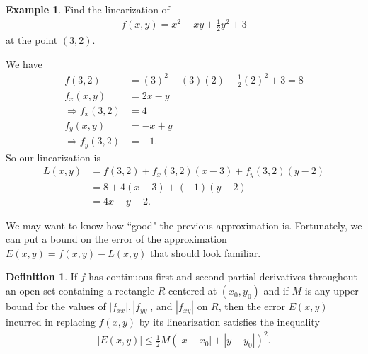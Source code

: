 \documentclass[12pt, letter]{article}
\theoremstyle{plain}
\numberwithin{theorem}{section}
\theoremstyle{definition}
\newtheorem{definition}[theorem]{Definition}
\newtheorem{example}[theorem]{Example}
\begin{document}
\bigskip

\hrulefill

\bigskip


\begin{example}
Find the linearization of
\begin{align*}
f(x,y) = x^2-xy+\frac{1}{2}y^2+3
\end{align*}
at the point $(3,2)$.

\smallskip

We have
\begin{align*}
f(3,2) &= (3)^2-(3)(2)+\frac{1}{2}(2)^2+3 = 8\\
f_x(x,y) &=2x-y\\
\Rightarrow f_x(3,2) &= 4\\
f_y(x,y) &= -x+y\\
\Rightarrow f_y(3,2) &= -1.
\end{align*}
So our linearization is
\begin{align*}
L(x,y) &= f(3,2) + f_x(3,2)(x-3)+f_y(3,2)(y-2)\\
&= 8+4(x-3)+(-1)(y-2)\\
&=4x-y-2.
\end{align*}
\end{example}

\bigskip

\hrulefill

\bigskip

We may want to know how ``good" the previous approximation is. Fortunately, we can put a bound on the error of the approximation $E(x,y) = f(x,y) - L(x,y)$ that should look familiar.

\bigskip

\begin{definition}
If $f$ has continuous first and second partial derivatives throughout an open set containing a rectangle $R$ centered at $(x_0,y_0)$ and if $M$ is any upper bound for the values of $|f_{xx}|, |f_{yy}|$, and $|f_{xy}|$ on $R$, then the error $E(x,y)$ incurred in replacing $f(x,y)$ by its linearization satisfies the inequality
\begin{align*}
|E(x,y)| \leq \frac{1}{2} M \left(|x-x_0|+|y-y_0|\right)^2.
\end{align*}
\end{definition}

\bigskip

\hrulefill

\bigskip
\end{document}
